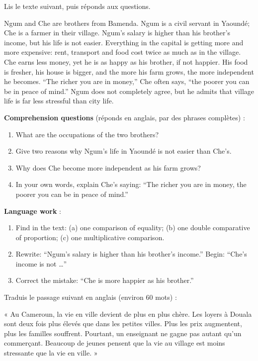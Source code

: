 \documentclass[11pt]{article}
\begin{document}
\begin{exercice}
Lis le texte suivant, puis réponds aux questions.

\begin{textebox}
Ngum and Che are brothers from Bamenda. Ngum is a civil servant in Yaoundé; Che is a farmer in their village. Ngum's salary is higher than his brother's income, but his life is not easier. Everything in the capital is getting more and more expensive: rent, transport and food cost twice as much as in the village. Che earns less money, yet he is as happy as his brother, if not happier. His food is fresher, his house is bigger, and the more his farm grows, the more independent he becomes. “The richer you are in money,” Che often says, “the poorer you can be in peace of mind.” Ngum does not completely agree, but he admits that village life is far less stressful than city life.
\end{textebox}

\textbf{Comprehension questions} (réponds en anglais, par des phrases complètes) :
\begin{enumerate}
\item What are the occupations of the two brothers?
\item Give two reasons why Ngum's life in Yaoundé is not easier than Che's.
\item Why does Che become more independent as his farm grows?
\item In your own words, explain Che's saying: “The richer you are in money, the poorer you can be in peace of mind.”
\end{enumerate}

\textbf{Language work} :
\begin{enumerate}
\item Find in the text: (a) one comparison of equality; (b) one double comparative of proportion; (c) one multiplicative comparison.
\item Rewrite: “Ngum's salary is higher than his brother's income.” Begin: “Che's income is not \ldots”
\item Correct the mistake: “Che is more happier as his brother.”
\end{enumerate}
\end{exercice}

\begin{exercice}
Traduis le passage suivant en anglais (environ 60 mots) :

« Au Cameroun, la vie en ville devient de plus en plus chère. Les loyers à Douala sont deux fois plus élevés que dans les petites villes. Plus les prix augmentent, plus les familles souffrent. Pourtant, un enseignant ne gagne pas autant qu'un commerçant. Beaucoup de jeunes pensent que la vie au village est moins stressante que la vie en ville. »
\end{exercice}
\end{document}
